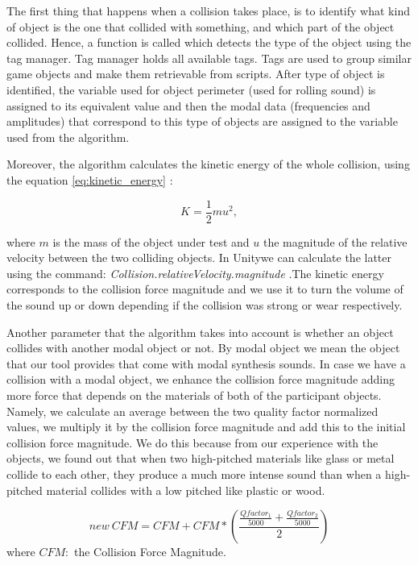 The first thing that happens when a collision takes place, is to identify what kind of object is the one that collided with something, and which part of the object collided. Hence, a function is called which detects the type of the object using the tag manager. Tag manager holds all available tags. Tags are used to group similar game objects and make them retrievable from scripts. After type of object is identified, the variable used for object perimeter (used for rolling sound) is assigned to its equivalent value and then the modal data (frequencies and amplitudes) that correspond to this type of objects are assigned to the variable used from the algorithm.

Moreover, the algorithm calculates the kinetic energy of the whole collision, using the equation \ref{eq:kinetic_energy} \cite{crowell2003conservation}: 

\begin{equation}\label{eq:kinetic_energy}
K = \frac{1}{2} m u^2,
\end{equation}

\noindent where $m$ is the mass of the object under test and $u$ the magnitude of the relative velocity between the two colliding objects. In Unity\textregistered we can calculate the latter using the command: \textit{Collision.relativeVelocity.magnitude} \cite{bib:unity_doc}.The kinetic energy corresponds to the collision force magnitude and we use it to turn the volume of the sound up or down depending if the collision was strong or wear respectively.

Another parameter that the algorithm takes into account is whether an object collides with another modal object or not. By modal object we mean the object that our tool provides that come with modal synthesis sounds. In case we have a collision with a modal object, we enhance the collision force magnitude adding more force that depends on the materials of both of the participant objects. Namely, we calculate an average between the two quality factor normalized values, we multiply it by the collision force magnitude and add this to the initial collision force magnitude. We do this because from our experience with the objects, we found out that when two high-pitched materials like glass or metal collide to each other, they produce a much more intense sound than when a high-pitched material collides with a low pitched like plastic or wood.  

\begin{equation}
new\ CFM = CFM + CFM*\left( \frac{\frac{Qfactor_1}{5000} + \frac{Qfactor_2}{5000}}{2} \right)
\end{equation} 
\noindent where $CFM:$ the Collision Force Magnitude.

